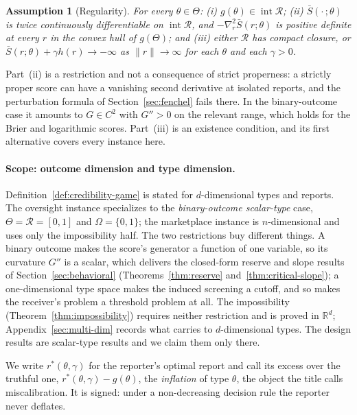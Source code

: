 \documentclass[acmsmall,nonacm,screen]{acmart}
\theoremstyle{acmplain}%
\newtheorem{assumption}[theorem]{Assumption}%
\theoremstyle{acmdefinition}%
\newcommand{\R}{\mathbb{R}}
\newcommand{\calR}{\mathcal{R}}
\newcommand{\Sbar}{\bar{S}}
\numberwithin{equation}{section}
\begin{document}
\begin{assumption}[Regularity]\label{assum:regularity}
For every $\theta \in \Theta$: (i) $g(\theta) \in \operatorname{int}\calR$; (ii) $\Sbar(\cdot\,;\theta)$ is twice continuously differentiable on $\operatorname{int}\calR$, and $-\nabla^2_r \Sbar(r;\theta)$ is positive definite at every $r$ in the convex hull of $g(\Theta)$; and (iii) either $\calR$ has compact closure, or $\Sbar(r;\theta) + \gamma h(r) \to -\infty$ as $\|r\| \to \infty$ for each $\theta$ and each $\gamma > 0$.
\end{assumption}

Part~(ii) is a restriction and not a consequence of strict properness: a strictly proper score can have a vanishing second derivative at isolated reports, and the perturbation formula of Section~\ref{sec:fenchel} fails there. In the binary-outcome case it amounts to $G \in C^2$ with $G'' > 0$ on the relevant range, which holds for the Brier \citep{brier1950verification} and logarithmic scores. Part~(iii) is an existence condition, and its first alternative covers every instance here.

\paragraph{Scope: outcome dimension and type dimension.}
Definition~\ref{def:credibility-game} is stated for $d$-dimensional types and reports. The oversight instance specializes to the \emph{binary-outcome scalar-type} case, $\Theta = \calR = [0,1]$ and $\Omega = \{0,1\}$; the marketplace instance is $n$-dimensional and uses only the impossibility half. The two restrictions buy different things. A binary outcome makes the score's generator a function of one variable, so its curvature $G''$ is a scalar, which delivers the closed-form reserve and slope results of Section~\ref{sec:behavioral} (Theorems~\ref{thm:reserve} and~\ref{thm:critical-slope}); a one-dimensional type space makes the induced screening a cutoff, and so makes the receiver's problem a threshold problem at all. The impossibility (Theorem~\ref{thm:impossibility}) requires neither restriction and is proved in $\R^d$; Appendix~\ref{sec:multi-dim} records what carries to $d$-dimensional types. The design results are scalar-type results and we claim them only there.

We write $r^*(\theta,\gamma)$ for the reporter's optimal report and call its excess over the truthful one, $r^*(\theta,\gamma) - g(\theta)$, the \emph{inflation} of type $\theta$, the object the title calls miscalibration. It is signed: under a non-decreasing decision rule the reporter never deflates.
\end{document}
